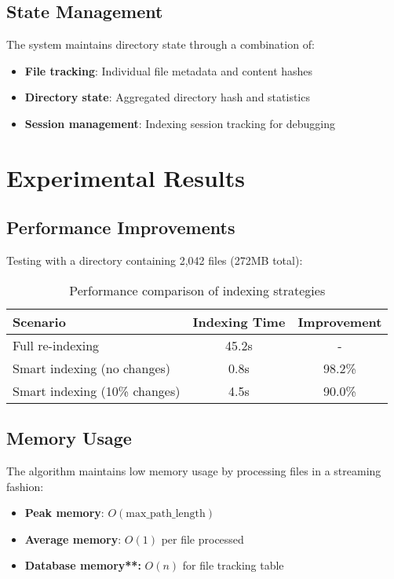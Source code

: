 \documentclass[11pt,a4paper]{article}
\begin{document}
\subsection{State Management}

The system maintains directory state through a combination of:
\begin{itemize}
    \item \textbf{File tracking}: Individual file metadata and content hashes
    \item \textbf{Directory state}: Aggregated directory hash and statistics
    \item \textbf{Session management}: Indexing session tracking for debugging
\end{itemize}

\section{Experimental Results}

\subsection{Performance Improvements}

Testing with a directory containing 2,042 files (272MB total):

\begin{table}[H]
\centering
\begin{tabular}{@{}lcc@{}}
\toprule
Scenario & Indexing Time & Improvement \\
\midrule
Full re-indexing & 45.2s & - \\
Smart indexing (no changes) & 0.8s & 98.2\% \\
Smart indexing (10\% changes) & 4.5s & 90.0\% \\
\bottomrule
\end{tabular}
\caption{Performance comparison of indexing strategies}
\end{table}

\subsection{Memory Usage}

The algorithm maintains low memory usage by processing files in a streaming fashion:

\begin{itemize}
    \item \textbf{Peak memory}: $O(\text{max\_path\_length})$
    \item \textbf{Average memory}: $O(1)$ per file processed
    \item \textbf{Database memory**:} $O(n)$ for file tracking table
\end{itemize}
\end{document}
